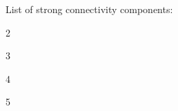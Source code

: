 \documentclass{article}
\begin{document}
List of strong connectivity components:


2

3

4

5
\end{document}
